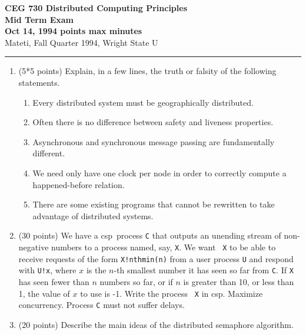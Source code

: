 \def\fat{\framebox[1mm]{\rule{0mm}{2mm}}}
\def\CSP{{\sc csp}}
\def\RPC{{\sc rpc}}
\parindent=0pt



{\bf CEG 
\large \bf 730 Distributed Computing Principles\\[5pt]
\large Mid Term Exam\\[10pt]
Oct 14, 1994  points max  minutes\\
}
\bigskip
{Mateti,  Fall Quarter 1994, Wright State U}\\[-5pt]
\hrule

\begin{enumerate}

\item (5*5 points)
Explain, in a few lines, the truth or falsity of the following
statements.

\begin{enumerate}
\item
Every distributed system must be geographically
distributed.

\item
Often there is no difference between safety and liveness properties.

\item Asynchronous and synchronous message passing are fundamentally
different.

\item
We need only have one clock per node in order to correctly compute a
happened-before relation.

\item There are some existing programs that cannot be rewritten
to take advantage of distributed systems.


\end{enumerate}

\item (30 points)
We have a \CSP\ process {\tt C} that outputs an unending stream of
non-negative numbers to a process named, say, {\tt X}.  We want {\tt
X} to be able to receive requests of the form {\tt X!nthmin(n)} from a
user process {\tt U} and respond with {\tt U!x}, where $x$ is the
$n$-th smallest number it has seen so far from {\tt C}.  If {\tt X}
has seen fewer than $n$ numbers so far, or if $n$ is greater than 10,
or less than 1, the value of $x$ to use is -1.  Write the process {\tt
X} in \CSP.  Maximize concurrency.  Process {\tt C} must not suffer
delays.

\item (20 points)
Describe the main ideas of the distributed semaphore algorithm.



\end{enumerate}
